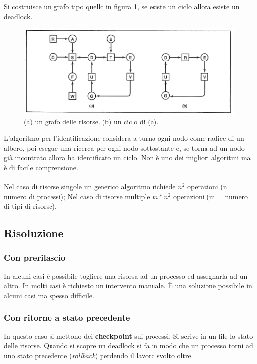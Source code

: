 Si costruisce un grafo tipo quello in figura \ref{grafi9}, se esiste un ciclo allora esiste un deadlock.

\begin{figure}[H]
    \centering
    \includegraphics[width=0.6\linewidth]{assets/grafi9.png}
    \caption{(a) un grafo delle risorse. (b) un ciclo di (a).}
    \label{grafi9}
\end{figure}

L'algoritmo per l'identificazione considera a turno ogni nodo come radice di un albero, poi esegue una ricerca per ogni nodo sottostante e, se torna ad un nodo già incontrato allora ha identificato un ciclo. Non è uno dei migliori algoritmi ma è di facile comprensione.

\paragraph*{}
Nel caso di risorse singole un generico algoritmo richiede $n^2$ operazioni (n = numero di processi); Nel caso di risorse multiple $m*n^2$ operazioni (m = numero di tipi di risorse).

\subsection{Risoluzione}

\subsubsection{Con prerilascio}
In alcuni casi è possibile togliere una risorsa ad un processo ed assegnarla ad un altro. In molti casi è richiesto un intervento manuale. È una soluzione possibile in alcuni casi ma spesso difficile. 

\subsubsection{Con ritorno a stato precedente}
In questo caso si mettono dei \textbf{checkpoint} sui processi. Si scrive in un file lo stato delle risorse. Quando si scopre un deadlock si fa in modo che un processo torni ad uno stato precedente (\textit{rollback}) perdendo il lavoro svolto oltre. 

